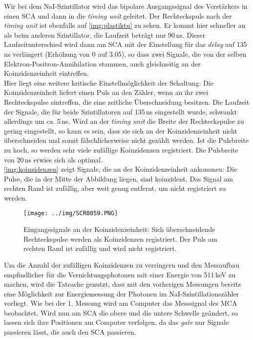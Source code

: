 Wir bei dem NaI-Szintillator wird das bipolare Ausgangssignal des Verstärkers in einen SCA
und dann in die \emph{timing unit} geleitet.
Der Rechteckspuls nach der \emph{timing unit} ist ebenfalls auf \autoref{img:plastiktu} zu sehen.
Er kommt hier schneller an als beim anderen Szintillator, 
die Laufzeit beträgt nur 90\,ns. Dieser Laufzeitunterschied wird dann am SCA mit der
Einstellung für das \emph{delay} auf 135\,ns verlängert (Erhöhung von 0 auf 3.05),
so dass zwei Signale, die von der selben
Elektron-Positron-Annihilation stammen, auch gleichzeitig an der Koinzidenzeinheit eintreffen.\\
Hier liegt eine weitere kritische Einstellmöglichkeit der Schaltung:
Die Koinzidenzeinheit liefert einen Puls an den Zähler, wenn an ihr zwei Rechteckspulse eintreffen,
die eine zeitliche Überschneidung besitzen.
Die Laufzeit der Signale, die für beide Szintillatoren auf 135\,ns eingestellt wurde,
schwankt allerdings um ca. 5\,ns. Wird an der \emph{timing unit}
die Breite der Rechteckspulse zu gering eingestellt, so
kann es sein, dass sie sich an der Koinzidenzeinheit nicht überschneiden und somit fälschlicherweise nicht
gezählt werden. Ist die Pulsbreite zu hoch, so werden sehr viele zufällige Koinzidenzen registriert.
Die Pulsbreite von 20\,ns erwies sich als optimal.\\
\autoref{img:koinzidenzen} zeigt Signale, die an der Koinzidenzeinheit ankommen:
Die Pulse, die in der Mitte der Abbildung liegen, sind koinzident.
Das Signal am rechten Rand ist zufällig, aber weit genug entfernt, um nicht registriert zu werden.
\begin{figure}[H]
\begin{center}
  \texttt{[image: ../img/SCR0059.PNG]}
  \caption[---]{Eingangssignale an der Koinzidenzeinheit: Sich überschneidende Rechteckspulse werden als 
  Koinzidenzen registriert. Der Puls am rechten Rand ist zufällig und wird nicht registriert.}
  \label{img:koinzidenzen}
\end{center}
\end{figure}
Um die Anzahl der zufälligen Koinzidenzen zu verringern
und den Messaufbau empfindlicher für die Vernichtungsphotonen mit einer Energie von 511\,keV zu machen,
wird die Tatsache genutzt, dass mit den vorherigen Messungen bereits eine Möglichkeit zur
Energiemessung der Photonen im NaI-Szintillationszähler vorliegt.
Wie bei der 1. Messung wird am Computer das Messsignal des MCA beobachtet.
Wird nun am SCA die obere und die untere Schwelle geändert, so lassen sich ihre Positionen
am Computer verfolgen, da das \emph{gate} nur Signale passieren lässt, die auch den SCA passieren.
